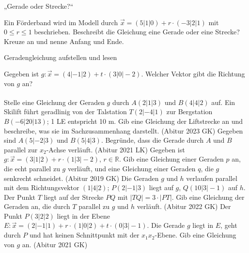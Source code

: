\setcounter{aufgabe}{9}

\begin{aufgabe}{„Gerade oder Strecke?“}
\begin{teile}
\teil Ein Förderband wird im Modell durch $\vec x = (5 | 1 | 0) + r \cdot (-3 | 2 | 1)$ mit $0 \le r \le 1$ beschrieben. Beschreibt die Gleichung eine Gerade oder eine Strecke? Kreuze an und nenne Anfang und Ende.  \\ 
\end{teile}
\end{aufgabe}

\begin{aufgabe}{Geradengleichung aufstellen und lesen}
\begin{teile}
\teil Gegeben ist $g\colon \vec x = (4 | -1 | 2) + t \cdot (3 | 0 | -2)$. Welcher Vektor gibt die Richtung von $g$ an?  \\  \\ 
\teil Stelle eine Gleichung der Geraden $g$ durch $A(2 | 1 | 3)$ und $B(4 | 4 | 2)$ auf.
\teil Ein Skilift führt geradlinig von der Talstation $T(2 | -4 | 1)$ zur Bergstation $B(-6 | 20 | 13)$; 1 LE entspricht 10 m. Gib eine Gleichung der Liftstrecke an und beschreibe, was sie im Sachzusammenhang darstellt. \hfill (Abitur 2023 GK)
\teil Gegeben sind $A(5 | -2 | 3)$ und $B(5 | 4 | 3)$. Begründe, dass die Gerade durch $A$ und $B$ parallel zur $x_2$-Achse verläuft. \hfill (Abitur 2021 LK)
\teil Gegeben ist $g\colon \vec x = (3 | 1 | 2) + r \cdot (1 | 3 | -2)$, $r \in \mathbb{R}$. Gib eine Gleichung einer Geraden $p$ an, die echt parallel zu $g$ verläuft, und eine Gleichung einer Geraden $q$, die $g$ senkrecht schneidet. \hfill (Abitur 2019 GK)
\teil Die Geraden $g$ und $h$ verlaufen parallel mit dem Richtungsvektor $(1 | 4 | 2)$; $P(2 | -1 | 3)$ liegt auf $g$, $Q(10 | 3 | -1)$ auf $h$. Der Punkt $T$ liegt auf der Strecke $PQ$ mit $|TQ| = 3 \cdot |PT|$. Gib eine Gleichung der Geraden an, die durch $T$ parallel zu $g$ und $h$ verläuft. \hfill (Abitur 2022 GK)
\teil Der Punkt $P(3 | 2 | 2)$ liegt in der Ebene $E\colon \vec x = (2 | -1 | 1) + r \cdot (1 | 0 | 2) + t \cdot (0 | 3 | -1)$. Die Gerade $g$ liegt in $E$, geht durch $P$ und hat keinen Schnittpunkt mit der $x_1x_2$-Ebene. Gib eine Gleichung von $g$ an. \hfill (Abitur 2021 GK)
\end{teile}
\end{aufgabe}

